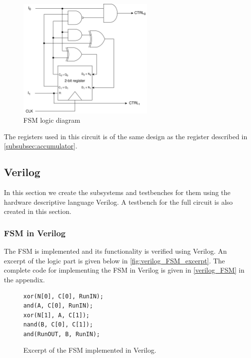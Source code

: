 \begin{figure}[H]
    \centering
    \includegraphics[width=0.6\textwidth]{Figures/logic diagram.png}
    \caption{FSM logic diagram}
    \label{fig:fsm_logic_diagram}
\end{figure}

\noindent
The registers used in this circuit is of the same design as the register described in \autoref{subsubsec:accumulator}.


\subsection{Verilog}

In this section we create the subsystems and testbenches for them using the hardware descriptive language Verilog. A testbench for the full circuit is also created in this section.

\subsubsection{FSM in Verilog}
\label{subsec:fsm_verilog}

The FSM is implemented and its functionality is verified using Verilog. An excerpt of the logic part is given below in \autoref{fig:verilog_FSM_excerpt}. The complete code for implementing the FSM in Verilog is given in \autoref{verilog_FSM} in the appendix.


\begin{figure}[H]
\centering
\caption{Excerpt of the FSM implemented in Verilog.}
\label{fig:verilog_FSM_excerpt}
\begin{minipage}{0.33\textwidth}
\begin{lstlisting}[style=verilogStyle]
xor(N[0], C[0], RunIN);
and(A, C[0], RunIN);
xor(N[1], A, C[1]);
nand(B, C[0], C[1]);
and(RunOUT, B, RunIN);
\end{lstlisting}
\end{minipage}
\end{figure}


